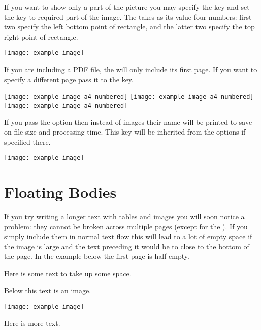 If you want to show only a part of the picture you may specify the
 key and set the  key to required part of the
image. The  takes as its value four numbers: first two specify
the left bottom point of rectangle, and the latter two specify the top right
point of rectangle.
\begin{example}
\texttt{[image: example-image]}
\end{example}

If you are including a PDF file, the  will only include its
first page. If you want to specify a different page pass it to the 
key.
\begin{example}
\texttt{[image: example-image-a4-numbered]}
\texttt{[image: example-image-a4-numbered]}
\texttt{[image: example-image-a4-numbered]}
\end{example}

If you pass the  option then instead of images their name will be
printed to save on file size and processing time. This key will be inherited
from the  options if specified there.
\begin{example}
\texttt{[image: example-image]}
\end{example}

\section{Floating Bodies}
If you try writing a longer text with tables and images you will soon notice a
problem: they cannot be broken across multiple pages (except for the
). If you simply include them in normal text flow this will lead
to a lot of empty space if the image is large and the text preceding it would
be to close to the bottom of the page. In the example below the first page is
half empty.
\begin{example}[standalone, paperheight=4cm, to_page=2, vertical_pages]
\usepackage{graphicx} %
\usepackage{ragged2e} %
\geometry{includefoot} %
Here is some text
to take up some space.

Below this text is an image.

\begin{Center}
  \texttt{[image: example-image]}
\end{Center}

Here is more text.
\end{example}

